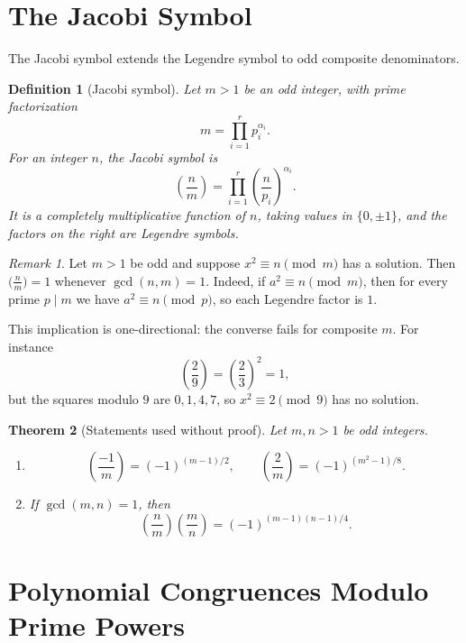 \documentclass[11pt]{article}
\newtheorem{theorem}{Theorem}[section]
\newtheorem{definition}[theorem]{Definition}
\theoremstyle{remark}
\newtheorem*{remark}{Remark}
\DeclareMathOperator{\gcdop}{gcd}
\begin{document}
\section{The Jacobi Symbol}

The Jacobi symbol extends the Legendre symbol to odd composite denominators.

\begin{definition}[Jacobi symbol]
Let $m>1$ be an odd integer, with prime factorization
\[
    m=\prod_{i=1}^r p_i^{\alpha_i}.
\]
For an integer $n$, the Jacobi symbol is
\[
    \boxed{
    \left(\frac nm\right)
    =
    \prod_{i=1}^r
    \left(\frac n{p_i}\right)^{\alpha_i}.
    }
\]
It is a completely multiplicative function of $n$, taking values in
$\{0,\pm 1\}$, and the factors on the right are Legendre symbols.
\end{definition}

\begin{remark}
Let $m>1$ be odd and suppose $x^2\equiv n\pmod m$ has a solution. Then
$\bigl(\frac nm\bigr)=1$ whenever $\gcdop(n,m)=1$. Indeed, if
$a^2\equiv n\pmod m$, then for every prime $p\mid m$ we have
$a^2\equiv n\pmod p$, so each Legendre factor is $1$.

This implication is one-directional: the converse fails for composite $m$.
For instance
\[
    \left(\frac{2}{9}\right)
    =
    \left(\frac{2}{3}\right)^2
    =1,
\]
but the squares modulo $9$ are $0,1,4,7$, so $x^2\equiv 2\pmod 9$ has no
solution.
\end{remark}

\begin{theorem}[Statements used without proof]
Let $m,n>1$ be odd integers.

\begin{enumerate}[label=\arabic*.]
    \item
    \[
        \left(\frac{-1}{m}\right)=(-1)^{(m-1)/2},
        \qquad
        \left(\frac{2}{m}\right)=(-1)^{(m^2-1)/8}.
    \]

    \item If $\gcdop(m,n)=1$, then
    \[
        \left(\frac nm\right)
        \left(\frac mn\right)
        =
        (-1)^{(m-1)(n-1)/4}.
    \]
\end{enumerate}
\end{theorem}

\section{Polynomial Congruences Modulo Prime Powers}
\end{document}
